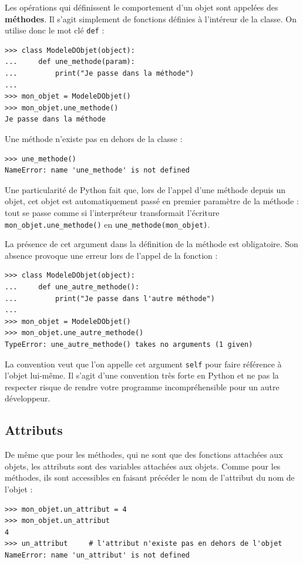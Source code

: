 \documentclass[12pt, a4paper]{article}
\begin{document}
Les opérations qui définissent le comportement d'un objet sont appelées des \textbf{méthodes}. 
Il s'agit simplement de fonctions définies à l'intéreur de la classe. On utilise donc le mot clé \lstinline{def} :
\begin{lstlisting}
>>> class ModeleDObjet(object):
...     def une_methode(param):
...         print("Je passe dans la méthode")
...
>>> mon_objet = ModeleDObjet()
>>> mon_objet.une_methode()
Je passe dans la méthode
\end{lstlisting}

Une méthode n'existe pas en dehors de la classe :
\begin{lstlisting}
>>> une_methode()
NameError: name 'une_methode' is not defined
\end{lstlisting}

Une particularité de Python fait que, lors de l'appel d'une méthode depuis un objet, cet objet est automatiquement passé en premier paramètre de la méthode : tout se passe comme si l'interpréteur transformait l'écriture \lstinline{mon_objet.une_methode()} en \lstinline{une_methode(mon_objet)}. 

La présence de cet argument dans la définition de la méthode est obligatoire. Son absence provoque une erreur lors de l'appel de la fonction :
\begin{lstlisting}
>>> class ModeleDObjet(object):
...     def une_autre_methode():
...         print("Je passe dans l'autre méthode")
...
>>> mon_objet = ModeleDObjet()
>>> mon_objet.une_autre_methode()
TypeError: une_autre_methode() takes no arguments (1 given)
\end{lstlisting}
	
La  convention veut que l'on appelle cet argument \lstinline{self} pour faire référence à l'objet lui-même. Il s'agit d'une convention très forte en Python et ne pas la respecter risque de rendre votre programme incompréhensible pour un autre développeur.


\subsection{Attributs}
De même que pour les méthodes, qui ne sont que des fonctions attachées aux objets, les attributs sont des variables attachées aux objets. Comme pour les méthodes, ils sont accessibles en faisant précéder le nom de l'attribut du nom de l'objet :
\begin{lstlisting}
>>> mon_objet.un_attribut = 4
>>> mon_objet.un_attribut
4
>>> un_attribut		# l'attribut n'existe pas en dehors de l'objet
NameError: name 'un_attribut' is not defined
\end{lstlisting}
\end{document}
